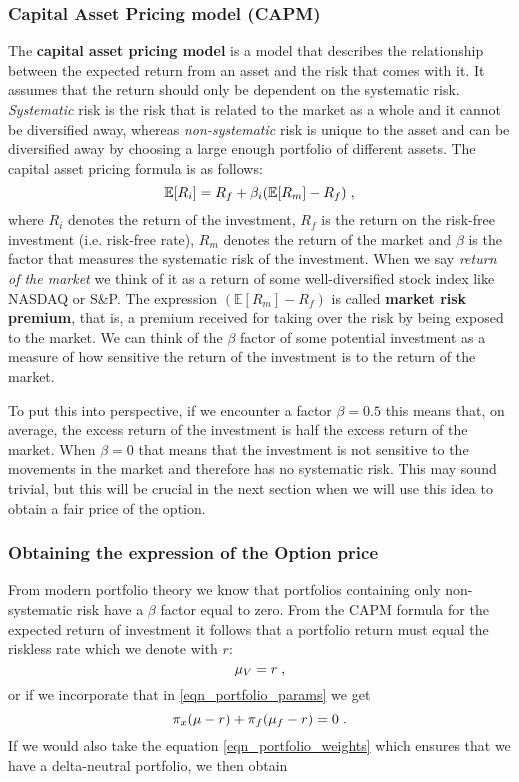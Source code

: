 \documentclass[times, utf8, diplomski]{fer}
\begin{document}
\subsubsection{Capital Asset Pricing model (CAPM)} %
The \textbf{capital asset pricing model} is a model that describes the relationship between the expected return from an asset and the risk that comes with it. It assumes that the return should only be dependent on the systematic risk. \textit{Systematic} risk is the risk that is related to the market as a whole and it cannot be diversified away, whereas \textit{non-systematic} risk is unique to the asset and can be diversified away by choosing a large enough portfolio of different assets. The capital asset pricing formula is as follows:
\begin{equation} \label{eqn_capm}
	\mathbb{E}[R_i] = R_f + \beta_i (\mathbb{E}[R_m] - R_f) \hspace{0.1cm},
\end{equation}
where $R_i$ denotes the return of the investment, $R_f$ is the return on the risk-free investment (i.e. risk-free rate), $R_m$ denotes the return of the market and $\beta$ is the factor that measures the systematic risk of the investment. When we say \textit{return of the market} we think of it as a return of some well-diversified stock index like NASDAQ or S\&P. The expression $(\mathbb{E}[R_m] - R_f)$ is called \textbf{market risk premium}, that is, a premium received for taking over the risk by being exposed to the market. We can think of the $\beta$ factor of some potential investment as a measure of how sensitive the return of the investment is to the return of the market. 

\noindent To put this into perspective, if we encounter a factor $\beta = 0.5$ this means that, on average, the excess return of the investment is half the excess return of the market. When $\beta = 0$ that means that the investment is not sensitive to the movements in the market and therefore has no systematic risk. This may sound trivial, but this will be crucial in the next section when we will use this idea to obtain a fair price of the option.

\subsubsection{Obtaining the expression of the Option price}
From modern portfolio theory we know that portfolios containing only non-systematic risk have a $\beta$ factor equal to zero. From the CAPM formula for the expected return of investment it follows that a portfolio return must equal the riskless rate which we denote with $r$: $$ \mu_V = r \hspace{0.1cm},$$ or if we incorporate that in \ref{eqn_portfolio_params} we get
\begin{equation} \label{eqn_comb_1}
	\pi_x(\mu - r) + \pi_f(\mu_f - r) = 0 \hspace{0.1cm}.
\end{equation}
If we would also take the equation \ref{eqn_portfolio_weights} which ensures that we have a delta-neutral portfolio, we then obtain
\end{document}

